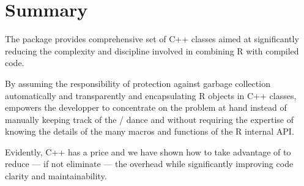 \section{Summary}

The  package provides comprehensive set of C++
classes aimed at significantly reducing the complexity and
discipline involved in combining R with compiled code.

By assuming the responsibility of protection against garbage
collection automatically and transparently and encapsulating R objects
in C++ classes,  empowers the developper to concentrate on 
the problem at hand instead of manually keeping track of 
the / dance and without requiring 
the expertise of knowing the details of the many macros and functions
of the R internal API.

Evidently, C++ has a price and we have shown how to take advantage
of  to reduce --- if not eliminate --- the overhead while
significantly improving code clarity and maintainability. 




\address{Dirk Eddelbuettel\\
  Debian Project\\
  Chicago, IL\\
  USA}\\

\address{Romain Fran\c{c}ois\\
  Professionnal R Enthusiast\\
  3 rue Emile Bonnet, 34 090 Montpellier\\
  FRANCE}\\


